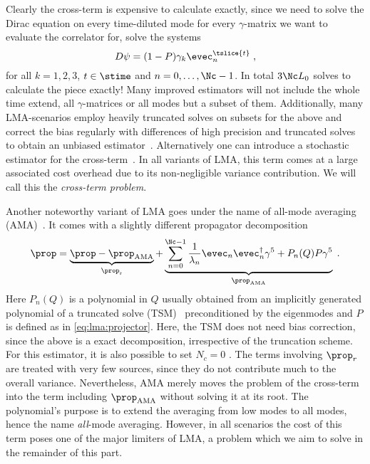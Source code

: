 Clearly the cross-term is expensive to calculate exactly, since we need to solve the Dirac equation on every time-diluted mode for every $\gamma$-matrix we want to evaluate the correlator for, \ie solve the systems
\begin{equation}
D \psi = (1-P) \gamma_k \evec_{n}^{\tslice{t}} \;,
\end{equation}
for all $k = 1,2,3$, $t \in \stime$ and $n = 0, \ldots, \Nc-1$.
In total $3 \Nc L_0$ solves to calculate the piece exactly!
Many improved estimators will not include the whole time extend, all $\gamma$-matrices or all modes but a subset of them.
Additionally, many LMA-scenarios employ heavily truncated solves on subsets for the above and correct the bias regularly with differences of high precision and truncated solves to obtain an unbiased estimator~\cite{bmw_2017,Kuberski_2023}.
Alternatively one can introduce a stochastic estimator for the cross-term~\cite{lynch2023,fermi_2023}.
In all variants of LMA, this term comes at a large associated cost overhead due to its non-negligible variance contribution.
We will call this the \emph{cross-term problem}.

Another noteworthy variant of LMA goes under the name of all-mode averaging (AMA)~\cite{Blum_2012,CAA,Blum_2015,RBC_2018}.
It comes with a slightly different propagator decomposition
\begin{equation}
\prop
= \underbrace{\prop - \prop_{\text{AMA}}}_{\prop_{\text{r}}}
+ \underbrace{\sum_{n=0}^{\Nc-1} \frac{1}{\lambda_n} \evec_n \evec_n^{\dagger} \gamma^{5}
+ P_n(Q) P \gamma^{5}}_{\prop_{\text{AMA}}} \;.
\end{equation}
Here $P_n(Q)$ is a polynomial in $Q$ usually obtained from an implicitly generated polynomial of a truncated solve (TSM)~\cite{Bali_2009} preconditioned by the eigenmodes and $P$ is defined as in \cref{eq:lma:projector}.
Here, the TSM does not need bias correction, since the above is a exact decomposition, irrespective of the truncation scheme.
For this estimator, it is also possible to set $N_c=0$ \cite{Blum_2012}.
The terms involving $\prop_{r}$ are treated with very few sources, since they do not contribute much to the overall variance.
Nevertheless, AMA merely moves the problem of the cross-term into the term including $\prop_{\text{AMA}}$ without solving it at its root.
The polynomial's purpose is to extend the averaging from low modes to all modes, hence the name \emph{all}-mode averaging.
However, in all scenarios the cost of this term poses one of the major limiters of LMA, a problem which we aim to solve in the remainder of this part.

